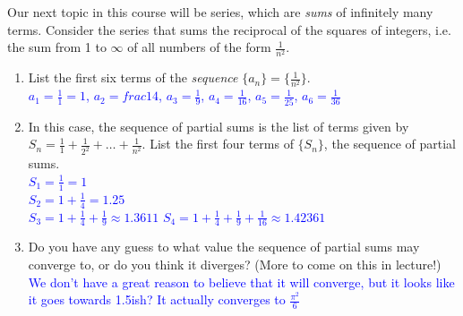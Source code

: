 \documentclass{ximera}
\begin{document}
\begin{exercise}
    Our next topic in this course will be series, which are \textit{sums} of infinitely many terms.  Consider the series that sums the reciprocal of the squares of integers, i.e. the sum from 1 to $\infty$ of all numbers of the form $\frac{1}{n^2}$.
    \begin{enumerate}
        \item List the first six terms of the \textit{sequence} $\{a_n\}=\{\frac{1}{n^2}\}$.\\
        \textcolor{blue}{$a_1=\frac{1}{1}=1$, $a_2=frac14$, $a_3=\frac19$, $a_4=\frac1{16}$, $a_5=\frac1{25}$, $a_6=\frac{1}{36}$}
        \item In this case, the sequence of partial sums is the list of terms given by $S_n=\frac{1}{1}+\frac{1}{2^2}+\dots +\frac{1}{n^2}$. List the first four terms of $\{S_n\}$, the sequence of partial sums.\\
        \textcolor{blue}{$S_1=\frac{1}{1}=1$\\
        $S_2=1+\frac14=1.25$\\
        $S_3=1+\frac14+\frac19\approx 1.3611$
        $S_4=1+\frac14+\frac19+\frac1{16}\approx 1.42361$}
        \item Do you have any guess to what value the sequence of partial sums may converge to, or do you think it diverges?  (More to come on this in lecture!)\\
        \textcolor{blue}{We don't have a great reason to believe that it will converge, but it looks like it goes towards 1.5ish?  It actually converges to $\frac{\pi^2}{6}$}
    \end{enumerate}
\end{exercise}
\end{document}
